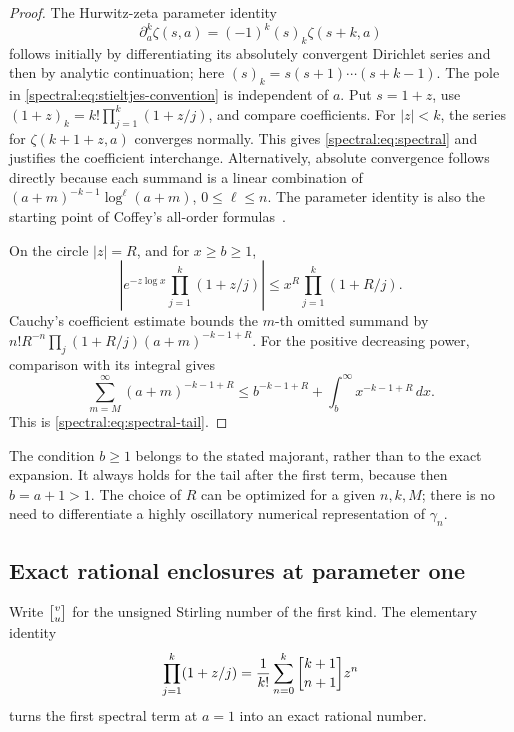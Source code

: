 \begin{proof}
The Hurwitz-zeta parameter identity
\[
\partial_a^k\zeta(s,a)=(-1)^k(s)_k\zeta(s+k,a)
\]
follows initially by differentiating its absolutely convergent
Dirichlet series and then by analytic continuation; here
\((s)_k=s(s+1)\cdots(s+k-1)\).
The pole in \eqref{spectral:eq:stieltjes-convention} is independent of \(a\).
Put \(s=1+z\), use
\((1+z)_k=k!\prod_{j=1}^k(1+z/j)\), and compare coefficients.
For \(|z|<k\), the series for \(\zeta(k+1+z,a)\) converges normally.
This gives \eqref{spectral:eq:spectral} and justifies the coefficient
interchange. Alternatively, absolute convergence follows directly
because each summand is a linear combination of
\((a+m)^{-k-1}\log^\ell(a+m)\), \(0\le\ell\le n\).
The parameter identity is also the starting point of
Coffey's all-order formulas~\cite{stieltjes:Coffey}.

On the circle \(|z|=R\), and for \(x\ge b\ge1\),
\[
\left|e^{-z\log x}\prod_{j=1}^k(1+z/j)\right|
\le x^R\prod_{j=1}^k(1+R/j).
\]
Cauchy's coefficient estimate bounds the \(m\)-th omitted summand
by \(n!R^{-n}\prod_j(1+R/j)(a+m)^{-k-1+R}\).
For the positive decreasing power, comparison with its integral gives
\[
\sum_{m=M}^{\infty}(a+m)^{-k-1+R}
\le b^{-k-1+R}+\int_b^\infty x^{-k-1+R}\,dx.
\]
This is \eqref{spectral:eq:spectral-tail}.
\end{proof}

The condition \(b\ge1\) belongs to the stated majorant, rather than to
the exact expansion. It always holds for the tail after the first
term, because then \(b=a+1>1\). The choice of \(R\) can be optimized
for a given \(n,k,M\); there is no need to differentiate a
highly oscillatory numerical representation of \(\gamma_n\).

\subsection{Exact rational enclosures at parameter one}

Write \(\stirling{v}{u}\) for the unsigned Stirling number of the
first kind. The elementary identity
\begin{equation}\label{spectral:eq:stirling-product}
\prod_{j=1}^k(1+z/j)
 =\frac1{k!}\sum_{n=0}^k\stirling{k+1}{n+1}z^n
\end{equation}
turns the first spectral term at \(a=1\) into an exact rational
number.

